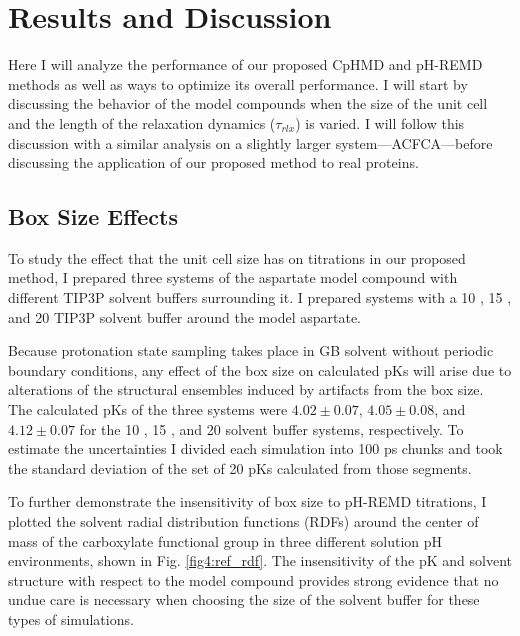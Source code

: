 \section{Results and Discussion}

Here I will analyze the performance of our proposed CpHMD and pH-REMD methods
as well as ways to optimize its overall performance. I will start by discussing
the behavior of the model compounds when the size of the unit cell and the
length of the relaxation dynamics ($\tau _ {rlx}$) is varied. I will follow
this discussion with a similar analysis on a slightly larger
system---ACFCA---before discussing the application of our proposed method to
real proteins.

\subsection{Box Size Effects}

To study the effect that the unit cell size has on titrations in our proposed
method, I prepared three systems of the aspartate model compound with different
TIP3P solvent buffers surrounding it. I prepared systems with a 10 \text{\AA},
15 \text{\AA}, and 20 \text{\AA} TIP3P solvent buffer around the model
aspartate.

Because protonation state sampling takes place in GB solvent without periodic
boundary conditions, any effect of the box size on calculated pKs will
arise due to alterations of the structural ensembles induced by artifacts from
the box size. The calculated pKs of the three systems were $4.02 \pm
0.07$, $4.05 \pm 0.08$, and $4.12 \pm 0.07$ for the 10 \text{\AA}, 15
\text{\AA}, and 20 \text{\AA} solvent buffer systems, respectively. To estimate
the uncertainties I divided each simulation into 100 ps chunks and took the
standard deviation of the set of 20 pKs calculated from those segments.

To further demonstrate the insensitivity of box size to pH-REMD titrations, I
plotted the solvent radial distribution functions (RDFs) around the center of
mass of the carboxylate functional group in three different solution pH
environments, shown in Fig. \ref{fig4:ref_rdf}. The insensitivity of the
pK and solvent structure with respect to the model compound provides
strong evidence that no undue care is necessary when choosing the size of the
solvent buffer for these types of simulations.

